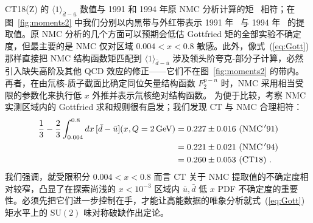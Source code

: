 CT18(Z) 的 $\langle 1 \rangle_{\bar{d}-\bar{u}}$ 数值与 1991 和 1994 年原 NMC 分析计算的矩~\cite{Amaudruz:1991at,Arneodo:1994sh} 相符；在图~\ref{fig:moments2} 中我们分别以内黑带与外红带表示 1991 年~\cite{Amaudruz:1991at} 与 1994 年~\cite{Arneodo:1994sh} 的提取值。原 NMC 分析的几个方面可以预期会低估 Gottfried 矩的全部实验不确定度，但最主要的是 NMC 仅对区域 $0.004\! <\! x\! <\! 0.8$ 敏感。此外，像式~(\ref{eq:Gott}) 那样直接把 NMC 结构函数矩匹配到 $\langle 1 \rangle_{\bar{d}-\bar{u}}$ 涉及领头阶夸克-部分子计算，必然引入缺失高阶及其他 QCD 效应的修正——它们不在图~\ref{fig:moments2} 的带内。再者，在由氘核-质子截面比确定同位矢量结构函数 $F^{p-n}_2$ 时，NMC 采用相当受限的参数化来执行低 $x$ 外推并表示氘核绝对结构函数。
为便于比较，考察 NMC 实测区域内的 Gottfried 求和规则很有启发；我们发现 CT 与 NMC 合理相符：
\begin{align}
	\frac{1}{3} - \frac{2}{3}\int_{0.004}^{0.8} dx\, [\bar{d}-\bar{u}](x,\Q=2\,\mathrm{GeV}) &= 0.227 \pm 0.016\ (\mathrm{NMC\, '91 }) \\
											       &= 0.221 \pm 0.021\ (\mathrm{NMC\, '94 }) \\
											       &= 0.260 \pm 0.053\ (\mathrm{CT18})\ .
\end{align}
我们强调，就受限积分 $0.004\! <\! x\! <\! 0.8$ 而言 CT 关于 NMC 提取值的不确定度相对较窄，凸显了在探索尚浅的 $x\! <\! 10^{-3}$ 区域内 $\bar{u}, \bar{d}$ 低 $x$ PDF 不确定度的重要性。必须先把它们进一步控制在手，才能让高能数据的唯象分析就式~(\ref{eq:Gott}) 矩水平上的 $\mathrm{SU}(2)$ 味对称破缺作出定论。

